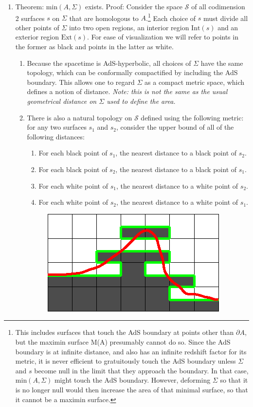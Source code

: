 \documentclass{article}
\begin{document}
\begin{enumerate}[resume]
\item \label{mexists} Theorem: $\mathrm{min}(A,\Sigma)$ exists.  Proof: Consider the space $\mathcal{S}$ of all codimension 2 surfaces $s$ on $\Sigma$ that are homologous to $A$.\footnote{This includes surfaces that touch the AdS boundary at points other than $\partial A$, but the maximin surface M(A) presumably cannot do so.  Since the AdS boundary is at infinite distance, and also has an infinite redshift factor for its metric, it is never efficient to gratuitously touch the AdS boundary unless $\Sigma$ and $s$ become null in the limit that they approach the boundary.  In that case, $\mathrm{min}(A,\Sigma)$ might touch the AdS boundary.  However, deforming $\Sigma$ so that it is no longer null would then increase the area of that minimal surface, so that it cannot be a maximin surface.} Each choice of $s$ must divide all other points of $\Sigma$ into two open regions, an interior region $\mathrm{Int}(s)$ and an exterior region $\mathrm{Ext}(s)$.  For ease of visualization we will refer to points in the former as black and points in the latter as white.
	\begin{enumerate}
	\item Because the spacetime is AdS-hyperbolic, all choices of $\Sigma$ have the same topology, which can be conformally compactified by including the AdS boundary.  This allows one to regard $\Sigma$ as a compact metric space, which defines a notion of distance.  \emph{Note: this is not the same as the usual geometrical distance on $\Sigma$ used to define the area.}
	\item \label{mintop} There is also a natural topology on $\mathcal{S}$ defined using the following metric: for any two surfaces $s_1$ and $s_2$, consider the upper bound of all of the following distances:
		\begin{enumerate}
		\item For each black point of $s_1$, the nearest distance to a black point of $s_2$.
		\item For each black point of $s_2$, the nearest distance to a black point of $s_1$.
		\item For each white point of $s_1$, the nearest distance to a white point of $s_2$.
		\item For each white point of $s_2$, the nearest distance to a white point of $s_1$.
		\end{enumerate}
\begin{figure}[hbt]
\centering
\includegraphics[width=.35\textwidth]{approx.eps}

\end{figure}
\end{enumerate}
\end{enumerate}
\end{document}

